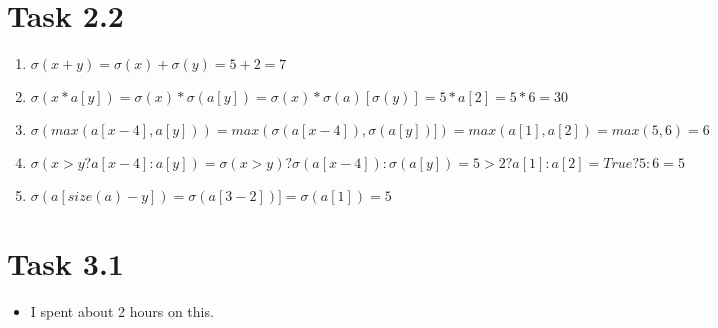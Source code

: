\documentclass{article}
\newcommand{\answer}{\item[]} %
\begin{document}
	\section{Task 2.2}
		\begin{enumerate}[label = {(\alph*)}]
			
			\item $\sigma (x + y) = \sigma (x) + \sigma(y) = 5 + 2 = 7$
			
			\item $\sigma (x * a[y]) = \sigma (x) * \sigma (a[y]) = \sigma (x) * \sigma (a)[\sigma(y)]= 5 * a[2] = 5 * 6 = 30$
			
			\item $\sigma (max(a[x - 4], a[y])) = max(\sigma (a[x - 4]), \sigma (a[y])]) = max(a[1], a[2]) = max(5, 6) = 6$
			
			\item $\sigma (x > y ? a[x - 4]: a[y]) = \sigma (x > y) ? \sigma (a[x - 4]): \sigma (a[y]) = 5 > 2 ? a[1]: a[2] = True ? 5: 6 = 5$
			
			\item $\sigma (a[size(a) - y]) = \sigma (a[3 - 2])] = \sigma (a[1]) = 5$
			
		\end{enumerate}
	
	\section{Task 3.1}
		\begin{itemize}
			
			\answer I spent about 2 hours on this.
			
		\end{itemize}
	
\end{document}
